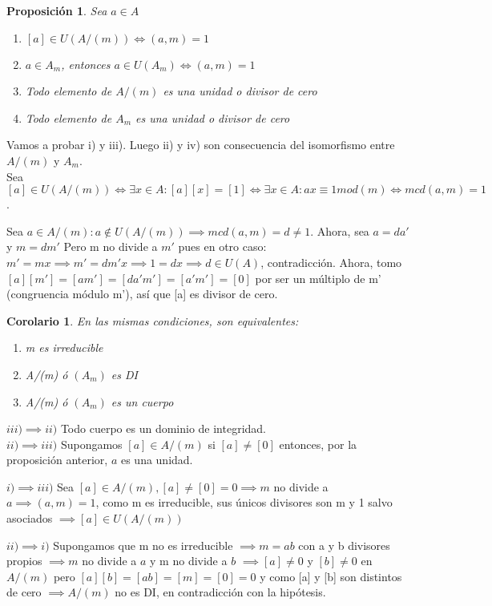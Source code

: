 \documentclass[11pt, a4paper, titlepage]{article}
\makeatletter
\renewenvironment{proof}[1][\proofname] {\vspace{-15pt}\par\pushQED{\qed}\normalfont\topsep6\p@\@plus6\p@\relax\trivlist\item[\hskip\labelsep\it#1\@addpunct{.}]\ignorespaces}{\popQED\endtrivlist\@endpefalse}
\theoremstyle{theorem-style}
\newtheorem*{nprop}{Proposición}
\newtheorem{ncor}{Corolario}
\theoremstyle{definition-style}
\theoremstyle{remark-style}
\theoremstyle{example-style}
\newenvironment{nlist}
{\begin{enumerate}
\renewcommand\labelenumi{(\emph{\roman{enumi})}}}
{\end{enumerate}}
\makeatother
\begin{document}
\begin{nprop} Sea $a \in A$
	\begin{nlist}
	\item $[a] \in U(A/(m)) \iff (a,m) = 1 $
	\item $a \in A_m$, entonces $a \in U(A_m) \iff (a,m) = 1$
	\item Todo elemento de $A/(m)$ es una unidad o divisor de cero
	\item Todo elemento de $A_m$ es una unidad o divisor de cero
\end{nlist}
\end{nprop}
\begin{proof}
	Vamos a probar i) y iii). Luego ii) y iv) son consecuencia del isomorfismo entre $A/(m)$ y $A_m$.\\
	Sea $[a] \in U(A/(m)) \iff \exists x \in A: [a][x] = [1] \iff \exists x \in A : ax \equiv 1mod(m) \iff mcd(a,m) = 1$.
	
	Sea $a \in A/(m) : a \notin U(A/(m)) \implies mcd(a,m) = d \ne 1$. Ahora, sea $a = da'$ y $m=dm'$
	Pero m no divide a $m'$ pues en otro caso: $m'=mx \implies m' = dm'x \implies 1 = dx \implies d \in U(A)$, contradicción.
	Ahora, tomo $[a][m'] = [am'] = [da'm'] = [a'm'] = [0]$ por ser un múltiplo de m' (congruencia módulo m'), así que [a] es divisor de cero.
\end{proof}

\begin{ncor}
	En las mismas condiciones, son equivalentes:
	
	\begin{nlist}
	\item m es irreducible
	\item A/(m) ó $(A_m)$ es DI
	\item A/(m) ó $(A_m)$ es un cuerpo
\end{nlist}
\end{ncor}
\begin{proof}
	$\boxed{iii) \implies ii)}$ Todo cuerpo es un dominio de integridad.\\
	$\boxed{ii) \implies iii)}$ Supongamos $[a] \in A/(m) $ si $[a] \ne [0]$ entonces, por la proposición anterior, $a$ es una unidad.
	
	$\boxed{i) \implies iii)}$ Sea $[a] \in A/(m), [a] \ne [0] = 0 \implies m$ no divide a $a \implies (a,m) = 1$, como m es irreducible, sus únicos divisores son m y 1 salvo asociados $\implies [a] \in U(A/(m))$
	
	$\boxed{ii)\implies i)}$ Supongamos que m no es irreducible $\implies m = ab$ con a y b divisores propios $\implies m$ no divide a $a$ y m no divide a $b$ $\implies [a] \ne 0 $ y $[b] \ne 0$ en $A/(m)$ pero $[a][b] = [ab] = [m] = [0] = 0$ y como [a] y [b] son distintos de cero $\implies A/(m)$ no es DI, en contradicción con la hipótesis.
\end{proof}
\end{document}
